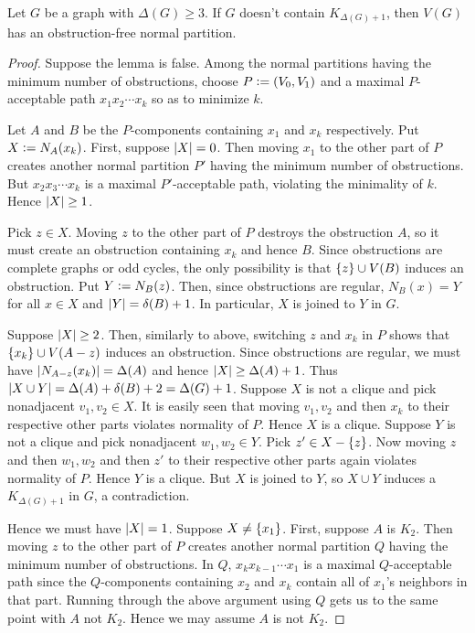 \begin{lem}\label{ObstructionFree}
Let $G$ be a graph with $\Delta(G) \geq 3$.  If $G$ doesn't contain
$K_{\Delta(G) + 1}$, then $V(G)$ has an obstruction-free normal partition.
\end{lem}
\begin{proof}
Suppose the lemma is false.  Among the normal partitions having the minimum
number of obstructions, choose $P \mathrel{\mathop:}= (V_0, V_1)$ and a
maximal $P$-acceptable path $x_1x_2\cdots x_k$ so as to minimize $k$.

Let $A$ and $B$ be the $P$-components containing $x_1$ and $x_k$ respectively.  
Put $X \mathrel{\mathop:}= N_A(x_k)$. First, suppose $\left|X\right| = 0$.  Then moving $x_1$ to the
other part of $P$ creates another normal partition $P'$ having the minimum number of
obstructions.  But $x_2x_3\cdots x_k$ is a maximal $P'$-acceptable path,
violating the minimality of $k$.  Hence $\left|X\right| \geq 1$.

Pick $z \in X$. Moving $z$ to the other part of $P$ destroys the obstruction $A$, so it must create an obstruction containing $x_k$ and hence $B$.  Since obstructions are complete graphs or odd cycles, the only possibility is that $\left\{ z \right\} \cup V(B)$ induces an
obstruction.  Put $Y \mathrel{\mathop:}= N_B(z)$.  Then, since obstructions are regular, $N_B(x) = Y$ for all $x \in X$ and $\left|Y\right| = \delta(B) + 1$.  In particular, $X$ is joined to $Y$ in $G$.

Suppose $\left|X\right| \geq 2$.  Then, similarly to above, switching $z$ and 
$x_k$ in $P$ shows that $\left\{ x_k \right\} \cup V(A - z)$ induces an obstruction.  Since
obstructions are regular, we must have $\left|N_{A-z}(x_k)\right| = \Delta(A)$ and hence $\left|X\right| \geq \Delta(A) + 1$.  
Thus $\left|X \cup Y\right| = \Delta(A) + \delta(B) + 2 = \Delta(G) + 1$.  Suppose $X$ is not a clique and pick nonadjacent $v_1, v_2 \in X$. It is easily seen that moving $v_1, v_2$ and then $x_k$ to their respective other parts violates normality of $P$.  Hence $X$ is a clique. Suppose $Y$ is not a clique and pick nonadjacent $w_1, w_2 \in Y$.  Pick $z' \in X - \left\{ z \right\}$. Now moving $z$ and then $w_1, w_2$ and then $z'$ to their respective other parts again violates normality of $P$.  Hence $Y$ is a clique.  But $X$ is joined to $Y$, so $X \cup Y$ induces a $K_{\Delta(G) + 1}$ in $G$, a contradiction.

Hence we must have $\left|X\right| = 1$.  Suppose $X \neq \left\{ x_1 \right\}$.  First, suppose $A$ is $K_2$.  Then moving $z$ to the other part of $P$ creates another normal partition $Q$ having the minimum number of obstructions.  In $Q$, $x_kx_{k-1}\cdots x_1$ is a maximal $Q$-acceptable path since the $Q$-components containing $x_2$ and $x_k$ contain all of $x_1$'s neighbors in that part.  Running through the above argument using $Q$ gets us to the same point with $A$ not $K_2$.  Hence we may assume $A$ is not $K_2$.


\end{proof}
